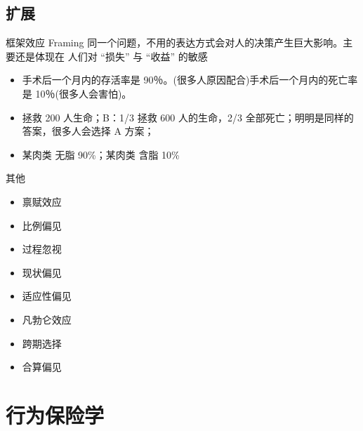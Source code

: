 \documentclass[presentation]{beamer}
\begin{document}


\subsection{扩展}
\begin{frame}{框架效应 Framing}
	同一个问题，不用的表达方式会对人的决策产生巨大影响。主要还是体现在 人们对 “损失” 与 “收益” 的敏感
	\begin{itemize}
		\item 手术后一个月内的存活率是 90％。(很多人原因配合)手术后一个月内的死亡率是 10％(很多人会害怕)。

		\item 拯救 200 人生命；B：1/3 拯救 600 人的生命，2/3 全部死亡；明明是同样的答案，很多人会选择 A 方案；

		\item 某肉类 无脂 90\%；某肉类 含脂 10\%
	\end{itemize}
\end{frame}
\begin{frame}{其他}
	\begin{itemize}
		\item 禀赋效应
		\item 比例偏见
		\item 过程忽视
		\item 现状偏见
		\item 适应性偏见
		\item 凡勃仑效应
		\item 跨期选择
		\item 合算偏见
	\end{itemize}
\end{frame}

\section{行为保险学}
\label{zc}
\end{document}
